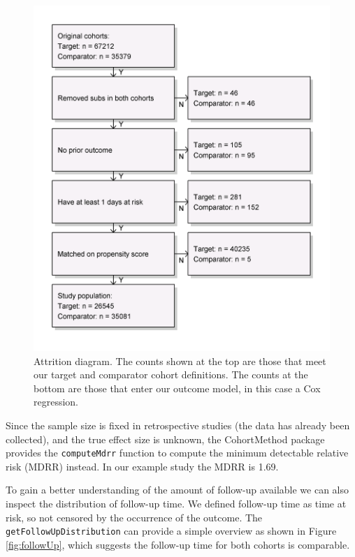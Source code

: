 \documentclass[11pt]{book}
\begin{document}
\begin{figure}

{\centering \includegraphics[width=0.7\linewidth]{images/PopulationLevelEstimation/attrition} 

}

\caption{Attrition diagram. The counts shown at the top are those that meet our target and comparator cohort definitions. The counts at the bottom are those that enter our outcome model, in  this case a Cox regression.}\label{fig:attrition}
\end{figure}

Since the sample size is fixed in retrospective studies (the data has
already been collected), and the true effect size is unknown, the
CohortMethod package provides the \texttt{computeMdrr} function to
compute the minimum detectable relative risk (MDRR) instead. In our
example study the MDRR is 1.69.

To gain a better understanding of the amount of follow-up available we
can also inspect the distribution of follow-up time. We defined
follow-up time as time at risk, so not censored by the occurrence of the
outcome. The \texttt{getFollowUpDistribution} can provide a simple
overview as shown in Figure \ref{fig:followUp}, which suggests the
follow-up time for both cohorts is comparable.
\end{document}
